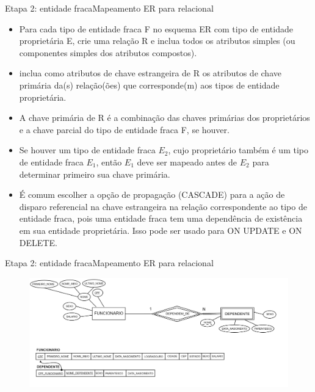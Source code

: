\documentclass[t]{beamer}
\begin{document}
\begin{ftst}{Etapa 2: entidade fraca}{Mapeamento ER para relacional}
\small
\begin{itemize}
    \item Para cada tipo de entidade fraca F no esquema ER com tipo de entidade proprietária E, crie uma relação R e inclua todos os atributos simples (ou componentes simples dos atributos compostos).
    \item inclua como atributos de chave estrangeira de R os atributos de chave primária da(s) relação(ões) que corresponde(m) aos tipos de entidade proprietária.
    \item A chave primária de R é a combinação das chaves primárias dos proprietários e a chave parcial do tipo de entidade fraca F, se houver.
    \item Se houver um tipo de entidade fraca $E_2$, cujo proprietário também é um tipo de entidade fraca $E_1$, então $E_1$ deve ser mapeado antes de $E_2$ para determinar primeiro sua chave primária.
    \item É comum escolher a opção de propagação (CASCADE) para a ação de disparo referencial na chave estrangeira na relação correspondente ao tipo de entidade fraca, pois uma entidade fraca tem uma dependência de existência em sua entidade proprietária. Isso pode ser usado para ON UPDATE e ON DELETE.
    
\end{itemize}
\end{ftst}


\begin{ftst}{Etapa 2: entidade fraca}{Mapeamento ER para relacional}
\vone
\vone
\begin{figure}
    \centering
    \includegraphics[scale=0.11]{Figuras/03_04.png}
\end{figure}
\end{ftst}
\end{document}
